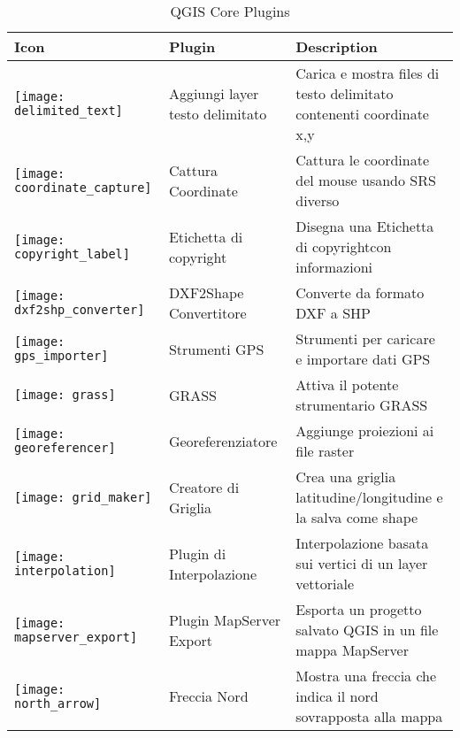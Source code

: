 \begin{minipage}{\textwidth}
\begin{table}[H]
\centering
\caption{QGIS Core Plugins}\label{tab:core_plugins}\medskip
\small
 \begin{tabular}{|l|l|p{4in}|}
\hline \textbf{Icon} & \textbf{Plugin} & \textbf{Description}\\
\hline
\texttt{[image: delimited\_text]}
 & Aggiungi layer testo delimitato \index{plugins!Testo delimitato} & Carica e mostra files di testo delimitato contenenti coordinate x,y\\
\hline
\texttt{[image: coordinate\_capture]}
 & Cattura Coordinate \index{plugins!Cattura coordinate}& Cattura le coordinate del mouse
usando SRS diverso\\
\hline 
\texttt{[image: copyright\_label]}
 & Etichetta di copyright \index{plugins!Etichetta di copyright}& Disegna una Etichetta di copyrightcon informazioni\\
\hline 
\texttt{[image: dxf2shp\_converter]}
 & DXF2Shape Convertitore \index{plugins!Convertitore DXF2Shape}& Converte da formato DXF a SHP\\
\hline
\texttt{[image: gps\_importer]}
 & Strumenti GPS \index{plugins!gps}& Strumenti per caricare e importare dati GPS\\
\hline
\texttt{[image: grass]}
 & GRASS \index{plugin!strumenti grass} & Attiva il potente strumentario GRASS\\
\hline
\texttt{[image: georeferencer]}
 & Georeferenziatore \index{plugin!georeferenziatore} & Aggiunge proiezioni ai file raster\\
\hline
\texttt{[image: grid\_maker]}
 & Creatore di Griglia \index{plugins!Creatore di Griglia}& Crea una griglia latitudine/longitudine e la salva come  shape\\
\hline
\texttt{[image: interpolation]}
& Plugin di Interpolazione  \index{plugins!Interpolazione}& Interpolazione basata sui vertici di un layer vettoriale\\
\hline
\texttt{[image: mapserver\_export]}
& Plugin MapServer Export \index{plugins!MapServer Export}& Esporta un progetto salvato QGIS
in un file mappa MapServer \\
\hline
\texttt{[image: north\_arrow]}
& Freccia Nord \index{plugins!Freccia Nord}& Mostra una freccia che indica il nord sovrapposta alla mappa\\

\end{tabular}
\end{table}
\end{minipage}
